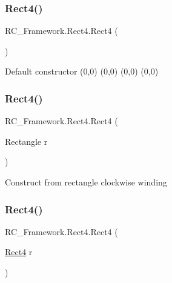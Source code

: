 \subsubsection{\texorpdfstring{Rect4()}{Rect4()}\hspace{0.1cm}{\footnotesize\ttfamily [1/3]}}
{\footnotesize\ttfamily R\+C\+\_\+\+Framework.\+Rect4.\+Rect4 (\begin{DoxyParamCaption}{ }\end{DoxyParamCaption})}



Default constructor (0,0) (0,0) (0,0) (0,0)

\mbox{\label{class_r_c___framework_1_1_rect4_a286c81d43d843dd2ac8063c0966ad131}} 
\subsubsection{\texorpdfstring{Rect4()}{Rect4()}\hspace{0.1cm}{\footnotesize\ttfamily [2/3]}}
{\footnotesize\ttfamily R\+C\+\_\+\+Framework.\+Rect4.\+Rect4 (\begin{DoxyParamCaption}\item[{Rectangle}]{r }\end{DoxyParamCaption})}



Construct from rectangle clockwise winding

\mbox{\label{class_r_c___framework_1_1_rect4_a6a3bcaf8e407350de7e6f86ee41545bb}} 
\subsubsection{\texorpdfstring{Rect4()}{Rect4()}\hspace{0.1cm}{\footnotesize\ttfamily [3/3]}}
{\footnotesize\ttfamily R\+C\+\_\+\+Framework.\+Rect4.\+Rect4 (\begin{DoxyParamCaption}\item[{\mbox{\hyperlink{class_r_c___framework_1_1_rect4}{Rect4}}}]{r }\end{DoxyParamCaption})}



